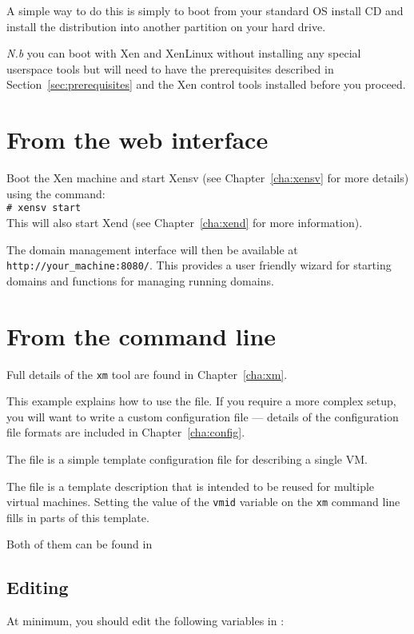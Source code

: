 \documentclass[11pt,twoside,final,openright]{xenstyle}
\begin{document}
A simple way to do this is simply to boot from your standard OS
install CD and install the distribution into another partition on your
hard drive.

{\em N.b } you can boot with Xen and XenLinux without installing any
special userspace tools but will need to have the prerequisites
described in Section~\ref{sec:prerequisites} and the Xen control tools
installed before you proceed.

\section{From the web interface}

Boot the Xen machine and start Xensv (see Chapter~\ref{cha:xensv} for
more details) using the command: \\
\verb_# xensv start_ \\
This will also start Xend (see Chapter~\ref{cha:xend} for more information).

The domain management interface will then be available at {\tt
http://your\_machine:8080/}.  This provides a user friendly wizard for
starting domains and functions for managing running domains.

\section{From the command line}

Full details of the {\tt xm} tool are found in Chapter~\ref{cha:xm}.

This example explains how to use the  file.  If you
require a more complex setup, you will want to write a custom
configuration file --- details of the configuration file formats are
included in Chapter~\ref{cha:config}.

The  file is a simple template configuration file
for describing a single VM.

The  file is a template description that is intended
to be reused for multiple virtual machines.  Setting the value of the
{\tt vmid} variable on the {\tt xm} command line
fills in parts of this template.

Both of them can be found in 
\subsection{Editing }

At minimum, you should edit the following variables in :
\end{document}
